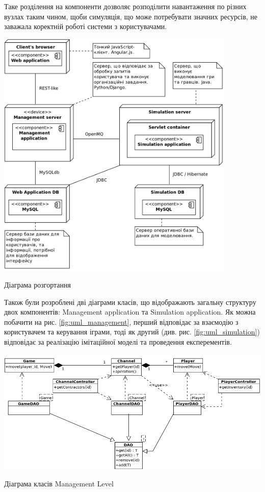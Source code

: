 Таке розділення на компоненти дозволяє розподілити навантаження по різних вузлах таким чином, щоби симуляція, що може потребувати значних ресурсів, не заважала коректній роботі системи з користувачами.
\begin{stdfigure}
    \includegraphics[width=4.5in]{images/uml/component_diagram.png}
    \caption{Діаграма розгортання}
    \label{fig:uml_components}
\end{stdfigure}   

Також були розроблені дві діаграми класів, що відображають загальну структуру двох компонентів: Management application та Simulation application. Як можна побачити на рис. \ref{fig:uml_management}, перший відповідає за взаємодію з користувачем та керування іграми, тоді як другий (див. рис. \ref{fig:uml_simulation}) відповідає за реалізацію імітаційної моделі та проведення експерементів.

\begin{stdfigure}
    \includegraphics[width=7in]{images/uml/management_level.png}
    \caption{Діаграма класів Management Level}
    \label{fig:uml_management}
\end{stdfigure}   

